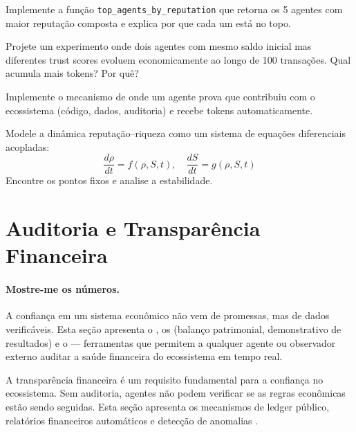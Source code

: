 \begin{exercicio}
Implemente a função \lstinline{top_agents_by_reputation} que
retorna os 5 agentes com maior reputação composta e explica
por que cada um está no topo.
\end{exercicio}

\begin{exercicio}
Projete um experimento onde dois agentes com mesmo saldo inicial
mas diferentes trust scores evoluem economicamente ao longo de
100 transações. Qual acumula mais tokens? Por quê?
\end{exercicio}

\begin{exercicio}
Implemente o mecanismo de  onde
um agente prova que contribuiu com o ecossistema (código, dados,
auditoria) e recebe tokens automaticamente.
\end{exercicio}

\begin{exercicio}
Modele a dinâmica reputação--riqueza como um sistema de equações
diferenciais acopladas:
\[
\frac{d\rho}{dt} = f(\rho, S, t), \quad \frac{dS}{dt} = g(\rho, S, t)
\]
Encontre os pontos fixos e analise a estabilidade.
\end{exercicio}

\section{Auditoria e Transparência Financeira}
\label{sec:auditoria-financeira}
\nivelintermediario

\paragraph{Mostre-me os números.} A confiança em um sistema econômico não vem de promessas, mas de dados verificáveis. Esta seção apresenta o , os  (balanço patrimonial, demonstrativo de resultados) e o  --- ferramentas que permitem a qualquer agente ou observador externo auditar a saúde financeira do ecossistema em tempo real.

A transparência financeira é um requisito fundamental para a
confiança no ecossistema. Sem auditoria, agentes não podem
verificar se as regras econômicas estão sendo seguidas. Esta
seção apresenta os mecanismos de ledger público, relatórios
financeiros automáticos e detecção de anomalias \cite{opencode2026token}.

